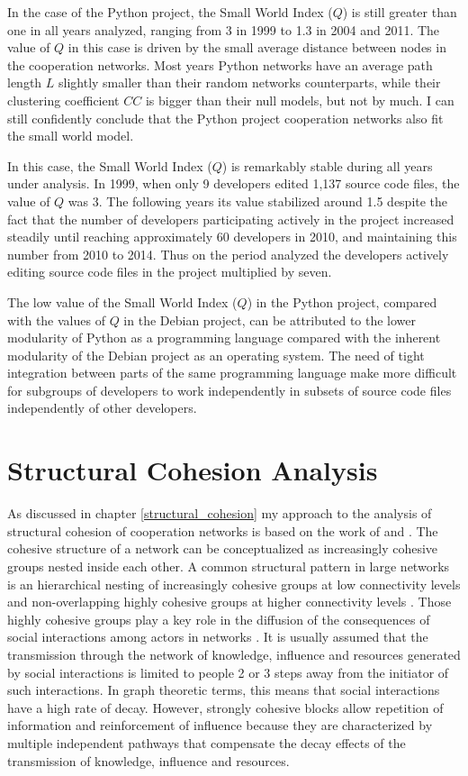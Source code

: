 

In the case of the Python project, the Small World Index ($Q$) is still greater than one in all years analyzed, ranging from 3 in 1999 to 1.3 in 2004 and 2011. The value of $Q$ in this case is driven by the small average distance between nodes in the cooperation networks. Most years Python networks have an average path length $L$ slightly smaller than their random networks counterparts, while their clustering coefficient $CC$ is bigger than their null models, but not by much. I can still confidently conclude that the Python project cooperation networks also fit the small world model.

In this case, the Small World Index ($Q$) is remarkably stable during all years under analysis. In 1999, when only 9 developers edited 1,137 source code files, the value of $Q$ was 3. The following years its value stabilized around 1.5 despite the fact that the number of developers participating actively in the project increased steadily until reaching approximately 60 developers in 2010, and maintaining this number from 2010 to 2014. Thus on the period analyzed the developers actively editing source code files in the project multiplied by seven.

The low value of the Small World Index ($Q$) in the Python project, compared with the values of $Q$ in the Debian project, can be attributed to the lower modularity of Python as a programming language compared with the inherent modularity of the Debian project as an operating system. The need of tight integration between parts of the same programming language make more difficult for subgroups of developers to work independently in subsets of source code files independently of other developers. 

\section{Structural Cohesion Analysis}

As discussed in chapter \ref{structural_cohesion} my approach to the analysis of structural cohesion of cooperation networks is based on the work of \citet{white:2001} and \citet{moody:2003}. The cohesive structure of a network can be conceptualized as increasingly cohesive groups nested inside each other. A common structural pattern in large networks is an hierarchical nesting of increasingly cohesive groups at low connectivity levels and non-overlapping highly cohesive groups at higher connectivity levels \citep[112]{moody:2003}. Those highly cohesive groups play a key role in the diffusion of the consequences of social interactions among actors in networks \citep[355-356]{white:2001}. It is usually assumed that the transmission through the network of knowledge, influence and resources generated by social interactions is limited to people 2 or 3 steps away from the initiator of such interactions. In graph theoretic terms, this means that social interactions have a high rate of decay. However, strongly cohesive blocks allow repetition of information and reinforcement of influence because they are characterized by multiple independent pathways that compensate the decay effects of the transmission of knowledge, influence and resources.

